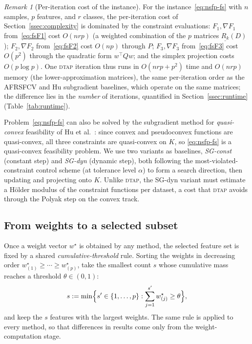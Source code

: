 \documentclass[]{interact}
\theoremstyle{plain}
\theoremstyle{definition}
\theoremstyle{remark}
\newtheorem{remark}{Remark}
\newcommand{\dtap}{\textsc{dtap}}
\begin{document}
\begin{remark}[Per-iteration cost of the instance]\label{rem:fs-cost}
For the instance~\eqref{eq:nsfp-fs} with $n$ samples, $p$ features, and $r$ classes, the per-iteration cost of Section~\ref{ssec:complexity} is dominated by the constraint evaluations: $F_1,\nabla F_1$ from~\eqref{eq:fsF1} cost $O(nrp)$ (a weighted combination of the $p$ matrices $\underline{R_k}(D)$); $F_2,\nabla F_2$ from~\eqref{eq:fsF2} cost $O(np)$ through $P$; $F_3,\nabla F_3$ from~\eqref{eq:fsF3} cost $O(p^2)$ through the quadratic form $w^{\top}Qw$; and the simplex projection costs $O(p\log p)$. One \dtap{} iteration thus runs in $O(nrp+p^2)$ time and $O(nrp)$ memory (the lower-approximation matrices), the same per-iteration order as the AFRSFCV and Hu subgradient baselines, which operate on the same matrices; the difference lies in the \emph{number} of iterations, quantified in Section~\ref{ssec:runtime} (Table~\ref{tab:runtime}).
\end{remark}

Problem~\eqref{eq:nsfp-fs} can also be solved by the subgradient method for \emph{quasi-convex} feasibility of Hu et al.~\citep{hu2022quasi}: since convex and pseudoconvex functions are quasi-convex, all three constraints are quasi-convex on $K$, so \eqref{eq:nsfp-fs} is a quasi-convex feasibility problem. We use two variants as baselines, \emph{SG-const} (constant step) and \emph{SG-dyn} (dynamic step), both following the most-violated-constraint control scheme (at tolerance level $\alpha$) to form a search direction, then updating and projecting onto $K$. Unlike \dtap, the SG-dyn variant must estimate a H\"older modulus of the constraint functions per dataset, a cost that \dtap{} avoids through the Polyak step on the convex track.

\subsection{From weights to a selected subset}\label{ssec:selection}
Once a weight vector $w^\star$ is obtained by any method, the selected feature set is fixed by a shared \emph{cumulative-threshold} rule. Sorting the weights in decreasing order $w^\star_{(1)}\ge\cdots\ge w^\star_{(p)}$, take the smallest count $s$ whose cumulative mass reaches a threshold $\theta\in(0,1)$:
\begin{equation}\label{eq:thetaRule}
s:=\min\Bigl\{s'\in\{1,\dots,p\}:\sum_{j=1}^{s'}w^\star_{(j)}\ge\theta\Bigr\},
\end{equation}
and keep the $s$ features with the largest weights. The same rule is applied to every method, so that differences in results come only from the weight-computation stage.
\end{document}
